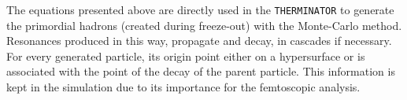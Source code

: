       The equations presented above are directly used in the \verb|THERMINATOR| to generate the primordial hadrons (created during freeze-out) with the Monte-Carlo method.
      Resonances produced in this way, propagate and decay, in cascades if necessary. 
      For every generated particle, its origin point either on a hypersurface or is associated with the point of the decay of the parent particle.
      This information is kept in the simulation due to its importance for the femtoscopic analysis.